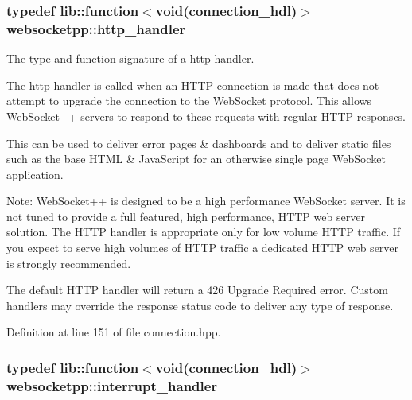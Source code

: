 \hypertarget{namespacewebsocketpp_a37bc4d5b3b21d3bb494d8a23236315d2}{}
\subsubsection[{http\+\_\+handler}]{\setlength{\rightskip}{0pt plus 5cm}typedef lib\+::function$<$void({\bf connection\+\_\+hdl})$>$ {\bf websocketpp\+::http\+\_\+handler}}\label{namespacewebsocketpp_a37bc4d5b3b21d3bb494d8a23236315d2}


The type and function signature of a http handler. 

The http handler is called when an H\+T\+T\+P connection is made that does not attempt to upgrade the connection to the Web\+Socket protocol. This allows Web\+Socket++ servers to respond to these requests with regular H\+T\+T\+P responses.

This can be used to deliver error pages \& dashboards and to deliver static files such as the base H\+T\+M\+L \& Java\+Script for an otherwise single page Web\+Socket application.

Note\+: Web\+Socket++ is designed to be a high performance Web\+Socket server. It is not tuned to provide a full featured, high performance, H\+T\+T\+P web server solution. The H\+T\+T\+P handler is appropriate only for low volume H\+T\+T\+P traffic. If you expect to serve high volumes of H\+T\+T\+P traffic a dedicated H\+T\+T\+P web server is strongly recommended.

The default H\+T\+T\+P handler will return a 426 Upgrade Required error. Custom handlers may override the response status code to deliver any type of response. 

Definition at line 151 of file connection.\+hpp.

\hypertarget{namespacewebsocketpp_a55f6947df7673a9de3c44b6bd5d4a82a}{}
\subsubsection[{interrupt\+\_\+handler}]{\setlength{\rightskip}{0pt plus 5cm}typedef lib\+::function$<$void({\bf connection\+\_\+hdl})$>$ {\bf websocketpp\+::interrupt\+\_\+handler}}\label{namespacewebsocketpp_a55f6947df7673a9de3c44b6bd5d4a82a}


